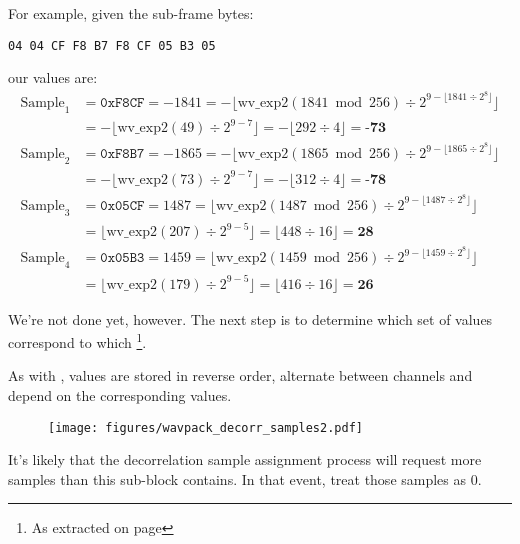 \par
\noindent
For example, given the sub-frame bytes:
\begin{Verbatim}[frame=single]
04 04 CF F8 B7 F8 CF 05 B3 05
\end{Verbatim}
our  values are:
\begin{align*}
\text{Sample}_1 &= \texttt{0xF8CF} = -1841
 = -\lfloor \text{wv\_exp2}(1841 \bmod{256}) \div 2 ^ {9 - \lfloor 1841 \div 2 ^ 8 \rfloor} \rfloor \\
&= -\lfloor \text{wv\_exp2}(49) \div 2 ^ {9 - 7} \rfloor
 = -\lfloor 292 \div 4 \rfloor = \textbf{-73} \\
\text{Sample}_2 &= \texttt{0xF8B7} = -1865
 = -\lfloor \text{wv\_exp2}(1865 \bmod{256}) \div 2 ^ {9 - \lfloor 1865 \div 2 ^ 8 \rfloor} \rfloor \\
&= -\lfloor \text{wv\_exp2}(73) \div 2 ^ {9 - 7} \rfloor
 =  -\lfloor 312 \div 4 \rfloor = \textbf{-78} \\
\text{Sample}_3 &= \texttt{0x05CF} = 1487
 = \lfloor \text{wv\_exp2}(1487 \bmod{256}) \div 2 ^ {9 - \lfloor 1487 \div 2 ^ 8 \rfloor} \rfloor \\
&= \lfloor \text{wv\_exp2}(207) \div 2 ^ {9 - 5} \rfloor
 = \lfloor 448 \div 16 \rfloor = \textbf{28} \\
\text{Sample}_4 &= \texttt{0x05B3} = 1459
 = \lfloor \text{wv\_exp2}(1459 \bmod{256}) \div 2 ^ {9 - \lfloor 1459 \div 2 ^ 8 \rfloor} \rfloor \\
&= \lfloor \text{wv\_exp2}(179) \div 2 ^ {9 - 5} \rfloor
 = \lfloor 416 \div 16 \rfloor = \textbf{26}
\end{align*}

\clearpage

We're not done yet, however.
The next step is to determine which set of 
values correspond to which \footnote{As
extracted on page \pageref{wavpack_decorr_terms}}.

As with ,
 values are stored in reverse order,
alternate between channels and depend on the corresponding
 values.
\begin{figure}[h]
\texttt{[image: figures/wavpack\_decorr\_samples2.pdf]}
\end{figure}
\par
\noindent
It's likely that the decorrelation sample assignment process will
request more samples than this sub-block contains.
In that event, treat those samples as 0.

